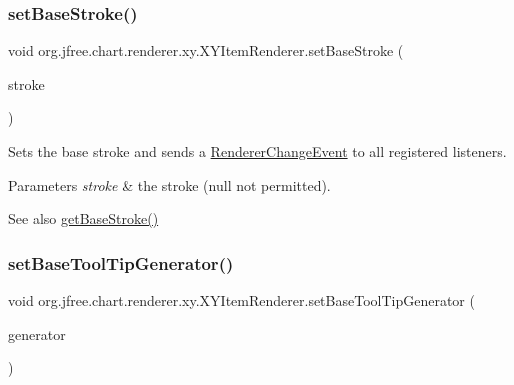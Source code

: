 \subsubsection{\texorpdfstring{set\+Base\+Stroke()}{setBaseStroke()}}
{\footnotesize\ttfamily void org.\+jfree.\+chart.\+renderer.\+xy.\+X\+Y\+Item\+Renderer.\+set\+Base\+Stroke (\begin{DoxyParamCaption}\item[{Stroke}]{stroke }\end{DoxyParamCaption})}

Sets the base stroke and sends a \mbox{\hyperlink{}{Renderer\+Change\+Event}} to all registered listeners.


\begin{DoxyParams}{Parameters}
{\em stroke} & the stroke ({\ttfamily null} not permitted).\\
\hline
\end{DoxyParams}
\begin{DoxySeeAlso}{See also}
\mbox{\hyperlink{interfaceorg_1_1jfree_1_1chart_1_1renderer_1_1xy_1_1_x_y_item_renderer_a79fb7d064aca7241db250c916c1739d5}{get\+Base\+Stroke()}} 
\end{DoxySeeAlso}
\mbox{\label{interfaceorg_1_1jfree_1_1chart_1_1renderer_1_1xy_1_1_x_y_item_renderer_ae53df47412e048dfb68cf0cdf578c394}} 
\subsubsection{\texorpdfstring{set\+Base\+Tool\+Tip\+Generator()}{setBaseToolTipGenerator()}}
{\footnotesize\ttfamily void org.\+jfree.\+chart.\+renderer.\+xy.\+X\+Y\+Item\+Renderer.\+set\+Base\+Tool\+Tip\+Generator (\begin{DoxyParamCaption}\item[{\mbox{\hyperlink{interfaceorg_1_1jfree_1_1chart_1_1labels_1_1_x_y_tool_tip_generator}{X\+Y\+Tool\+Tip\+Generator}}}]{generator }\end{DoxyParamCaption})}

